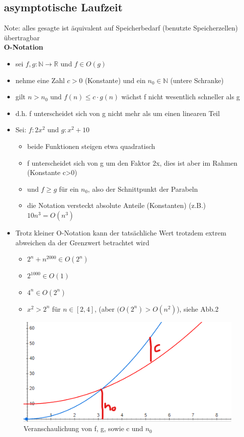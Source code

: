 \documentclass[12pt,a4paper]{article}
\begin{document}
\subsection{asymptotische Laufzeit}
Note: alles gesagte ist äquivalent auf Speicherbedarf (benutzte Speicherzellen) übertragbar\\
\textbf{O-Notation}
\begin{itemize}
\item sei $f, g: \mathbb{N} \rightarrow \mathbb{R}$ und $f \in O(g)$
\item nehme eine Zahl $c > 0$ (Konstante) und ein $n_0 \in \mathbb{N}$ (untere Schranke)
\item gilt $n > n_0$ und $f(n) \leq c\cdot g(n)$ wächst f nicht wesentlich schneller als g
\item d.h. f unterscheidet sich von g nicht mehr als um einen linearen Teil
\item Sei: $f: 2x^2$ und $g:x^2+10$
\begin{itemize}
\item beide Funktionen steigen etwa quadratisch
\item f  unterscheidet sich von g um den Faktor 2x, dies ist aber im Rahmen (Konstante c>0)
\item und $f \geq g$ für ein $n_0$, also der Schnittpunkt der Parabeln
\item die Notation versteckt absolute Anteile (Konstanten) (z.B.) $10n^3 = O(n^3)$
\end{itemize}
\item Trotz kleiner O-Notation kann der tatsächliche Wert trotzdem extrem abweichen da der Grenzwert betrachtet wird
\begin{itemize}
\item $2^n + n^{2000} \in O(2^n)$
\item $2^{1000} \in O(1)$
\item $4^n \in O(2^n)$
\item $x^2 > 2^n$ für $n \in [2, 4]$,\hspace{5pt} (aber $(O(2^n) > O(n^2)$), siehe Abb.2
\end{itemize}
\end{itemize}
\begin{figure}[H]
\includegraphics[scale=0.6]{resources/O-vergleich.png}
\caption{Veranschaulichung von f, g, sowie c und $n_0$}
\label{fig}
\end{figure}
\end{document}

